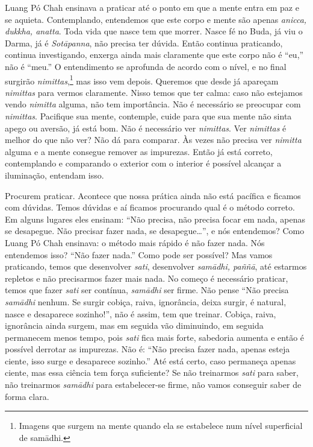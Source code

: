 Luang Pó Chah ensinava a praticar até o ponto em que a mente entra
em paz e se aquieta. Contemplando, entendemos que este corpo e mente
são apenas \emph{anicca, dukkha, anatta}. Toda vida que nasce tem que
morrer. Nasce fé no Buda, já viu o Darma, já é \emph{Sotāpanna},
não precisa ter dúvida. Então continua praticando, continua
investigando, enxerga ainda mais claramente que este corpo não é “eu,”
não é “meu.” O entendimento se aprofunda de acordo com o nível, e no
final surgirão \emph{nimittas},\footnote{Imagens que surgem na mente
quando ela se estabelece num nível superficial de samādhi.} mas isso
vem depois. Queremos que desde já apareçam \emph{nimittas} para
vermos claramente. Nisso temos que ter calma: caso não estejamos vendo
\emph{nimitta} alguma, não tem importância. Não é necessário se
preocupar com \emph{nimittas}. Pacifique sua mente, contemple, cuide
para que sua mente não sinta apego ou aversão, já está bom. Não é
necessário ver \emph{nimittas}. Ver \emph{nimittas} é melhor do que
não ver? Não dá para comparar. Às vezes não precisa ver
\emph{nimitta} alguma e a mente consegue remover as impurezas. Então
já está correto, contemplando e comparando o exterior com o interior é
possível alcançar a iluminação, entendam isso. 

Procurem praticar. Acontece que nossa prática ainda não está
pacífica e ficamos com dúvidas. Temos dúvidas e aí ficamos procurando
qual é o método correto. Em alguns lugares eles ensinam: “Não precisa,
não precisa focar em nada, apenas se desapegue. Não precisar fazer
nada, se desapegue\ldots{}”, e nós entendemos? Como Luang Pó Chah ensinava: o
método mais rápido é não fazer nada. Nós entendemos isso? “Não fazer
nada.” Como pode ser possível? Mas vamos praticando, temos que
desenvolver \emph{sati}, desenvolver \emph{samādhi, paññā}, até
estarmos repletos e não precisarmos fazer mais nada. No começo é
necessário praticar, temos que fazer \emph{sati} ser contínua,
\emph{samādhi} ser firme. Não pense “Não precisa \emph{samādhi}
nenhum. Se surgir cobiça, raiva, ignorância, deixa surgir, é natural,
nasce e desaparece sozinho!”, não é assim, tem que treinar. Cobiça,
raiva, ignorância ainda surgem, mas em seguida vão diminuindo, em
seguida permanecem menos tempo, pois \emph{sati} fica mais forte,
sabedoria aumenta e então é possível derrotar as impurezas. Não é: “Não
precisa fazer nada, apenas esteja ciente, isso surge e desaparece
sozinho.” Até está certo, caso permaneça apenas ciente, mas essa
ciência tem força suficiente? Se não treinarmos \emph{sati} para
saber, não treinarmos \emph{samādhi} para estabelecer-se firme, não
vamos conseguir saber de forma clara. 

